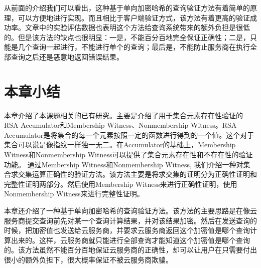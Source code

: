 从前面的介绍我们可以看出，这种基于单向加密哈希的查询验证方法有着简单的原理，可以方便地进行实现。而且相比于客户端验证方式，该方法有着更高的验证成功率。文章\cite{sion2005query}中的实验评估数据也表明这个方法给查询系统带来的额外负担是很低的。但是该方法的缺点也很明显：一是，不能百分百地完全保证正确性；二是，只能是几个查询一起进行，不能进行单个的查询；最后是，不能防止服务商在执行全部查询之后还是恶意地返回错误结果。

\section{本章小结}
本章介绍了本课题相关的已有研究。主要是介绍了用于集合元素存在性验证的RSA Accumulator和Membership Witness、Nonmembership Witness。RSA Accumulator是将集合的每一个元素按照一定的函数进行得到的一个值。这个对于集合可以说是像指纹一样独一无二。在Accumulator的基础上，Membership Witness和Nonmembership Witness可以提供了集合元素存在性和不存在性的验证功能。
通过Membership Witness和Nonmembership Witness, 我们介绍一种对集合求交集运算正确性的验证方法。该方法主要是将求交集的证明分为正确性证明和完整性证明两部分。然后使用Membership Witness来进行正确性证明，使用Nonmembership Witness来进行完整性证明。

本章还介绍了一种基于单向加密哈希的查询验证方法。该方法的主要思路是在像云服务商提交查询前先对某一个查询计算结果，并对该结果加密。然后在发送查询的时候，把加密值也发送给云服务商，并要求云服务商返回这个加密值是哪个查询计算出来的。这样，云服务商就只能进行全部查询才能知道这个加密值是哪个查询的。该方法虽然不能百分百地保证云服务商的正确性，却可以让用户在只需要付出很小的额外负担下，很大概率保证不被云服务商欺骗。

